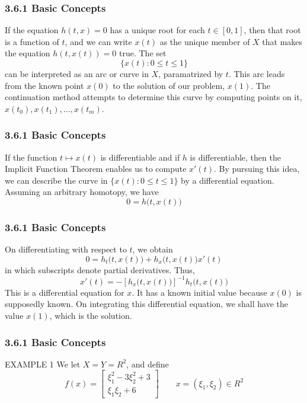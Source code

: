 \documentclass[notheorems,mathserif,table,compress]{beamer}  %
\begin{document}
\begin{frame}
  \frametitle{3.6.1 Basic Concepts}
  If the equation $h(t,x)=0$ has a unique root for each $t \in [0,1]$, then that root is a function of $t$, and we can write $x(t)$ as the unique member of $X$ that makes the equation $h(t,x(t))=0$ true. The set
  \[ \{ x(t):0 \le t \le 1 \} \]
  can be interpreted as an arc or curve in $X$, paramatrized by $t$. This arc leads from the known point $x(0)$ to the solution of our problem, $x(1)$. The continuation method attempts to determine this curve by computing points on it, $x(t_0),x(t_1),\ldots,x(t_m)$. 
\end{frame}


\begin{frame}
  \frametitle{3.6.1 Basic Concepts}
  If the function $t\mapsto x(t)$ is differentiable and if $h$ is differentiable, then the Implicit Function Theorem enables us to compute $x'(t)$. By pursuing this idea, we can describe the curve in $\{ x(t):0 \le t \le 1 \}$ by a differential equation. Assuming an arbitrary homotopy, we have
  \begin{displaymath}
  0=h\big( t,x(t) \big)
  \end{displaymath}
\end{frame}


\begin{frame}
  \frametitle{3.6.1 Basic Concepts}
  On differentiating with respect to $t$, we obtain
  \begin{displaymath}
  0=h_t \big( t,x(t) \big) +h_x \big( t,x(t) \big) x'(t)
  \end{displaymath}
  in which subscripts denote partial derivatives. Thus,
  \begin{displaymath}
  x'(t)=-[h_x\big( t,x(t)\big) ]^{-1} h_t \big( t,x(t) \big)
  \end{displaymath}
  This is a differential equation for $x$. It has a known initial value because $x(0)$ is supposedly known. On integrating this differential equation, we shall have the value $x(1)$, which is the solution.
\end{frame}


\begin{frame}
  \frametitle{3.6.1 Basic Concepts}
  \begin{exampleblock}{EXAMPLE 1}
  We let $X=Y=R^2$, and define
  \begin{displaymath}
  f(x) =
  \left[ \begin{array}{ccc}
  \xi_1^2-3\xi_2^2+3\\
  \xi_1\xi_2+6
  \end{array} \right]\qquad
  x=(\xi_1,\xi_2)\in R^2
  \end{displaymath}
  \end{exampleblock}
\end{frame}
\end{document}
